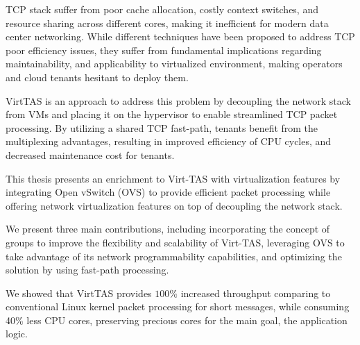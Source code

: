 TCP stack suffer from poor cache allocation, 
costly context switches, and resource sharing across 
different cores, making it inefficient for modern 
data center networking. While different techniques 
have been proposed to address TCP poor efficiency issues, they suffer 
from fundamental implications regarding maintainability, and
applicability to virtualized environment, making operators 
and cloud tenants hesitant to deploy them. 

VirtTAS is an approach to address this problem by decoupling the 
network stack from VMs and placing it on the hypervisor to enable 
streamlined TCP packet processing. By utilizing a shared TCP fast-path,
 tenants benefit from the multiplexing advantages, resulting in 
improved efficiency of CPU cycles, and decreased maintenance cost 
for tenants.

This thesis presents an enrichment to Virt-TAS with 
virtualization features by integrating Open vSwitch 
(OVS) to provide efficient packet processing while 
offering network virtualization features on top of 
decoupling the network stack. 

We present three main contributions, including 
incorporating the concept of groups to improve the flexibility 
and scalability of Virt-TAS, leveraging OVS to take advantage 
of its network programmability capabilities, 
and optimizing the solution by using fast-path processing. 

We showed that VirtTAS provides \(100 \% \) increased throughput comparing to conventional
Linux kernel packet processing for short messages, while 
consuming 40\% less CPU cores, preserving precious cores 
for the main goal, the application logic.